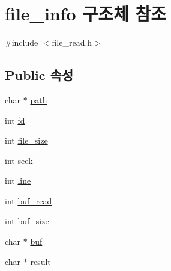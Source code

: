 \hypertarget{structfile__info}{\section{file\+\_\+info 구조체 참조}
\label{structfile__info}
}


{\ttfamily \#include $<$file\+\_\+read.\+h$>$}

\subsection*{Public 속성}
\begin{DoxyCompactItemize}
\item 
char $\ast$ \hyperlink{structfile__info_a031658e6d1a3906f23b26a88e05ce6d0}{path}
\item 
int \hyperlink{structfile__info_adccdbed71e76da97a23be347de511f42}{fd}
\item 
int \hyperlink{structfile__info_a3b73a528a567708069aae452c21290f2}{file\+\_\+size}
\item 
int \hyperlink{structfile__info_a8906d485cfe0e1095b3ed0e35c6e7506}{seek}
\item 
int \hyperlink{structfile__info_ab0c900c50eef067aed0a257b218e5396}{line}
\item 
int \hyperlink{structfile__info_a5e7cd4b63da2cf9f297b68adfc1b5b99}{buf\+\_\+read}
\item 
int \hyperlink{structfile__info_a29a3f8faa143e2c82fbd793dd49c6cd6}{buf\+\_\+size}
\item 
char $\ast$ \hyperlink{structfile__info_a2094ce0046c07f521ada8f1247280d95}{buf}
\item 
char $\ast$ \hyperlink{structfile__info_a0b17a1cbdb96ab198326c6073c862fe1}{result}
\end{DoxyCompactItemize}


